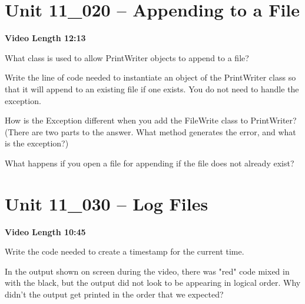 \documentclass[letterpaper,12pt]{exam}
\newcommand{\unit}{Unit 11}
\begin{document}
\begin{questions}
\section*{\unit\_020 -- Appending to a File} 
\par{\selectfont\textbf{Video Length 12:13}}

\begin{samepage}
    \question What class is used to allow PrintWriter objects to append to a file?
    \vspace{5mm}
\end{samepage}

\begin{samepage}
    \question Write the line of code needed to instantiate an object of the PrintWriter class so that it will append to an existing file if one exists.  You do not need to handle the exception.
    \vspace{5mm}
\end{samepage}

\begin{samepage}
    \question How is the Exception different when you add the FileWrite class to PrintWriter?  (There are two parts to the answer.  What method generates the error, and what is the exception?)
    \vspace{5mm}
\end{samepage}

\begin{samepage}
    \question What happens if you open a file for appending if the file does not already exist?
    \vspace{5mm}
\end{samepage}

\section*{\unit\_030 -- Log Files} 
\par{\selectfont\textbf{Video Length 10:45 }}

\begin{samepage}
    \question Write the code needed to create a timestamp for the current time.
    \vspace{5mm}
\end{samepage}

\begin{samepage}
    \question In the output shown on screen during the video, there was "red" code mixed in with the black, but the output did not look to be appearing in logical order.  Why didn't the output get printed in the order that we expected?
    \vspace{5mm}
\end{samepage}


\end{questions}
\end{document}

